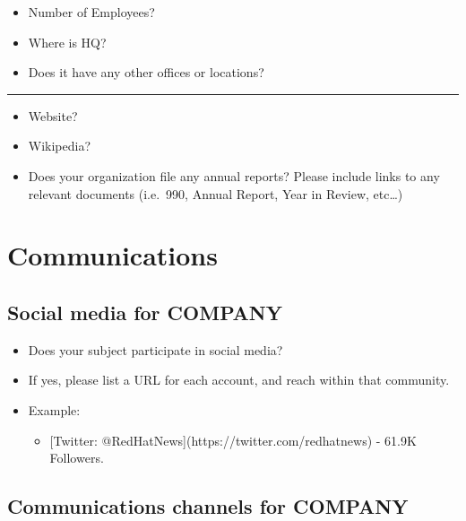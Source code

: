 \begin{itemize}
\itemsep1pt\parskip0pt
\item
  Number of Employees?
\item
  Where is HQ?
\item
  Does it have any other offices or locations?
\end{itemize}

\begin{center}\rule{3in}{0.4pt}\end{center}

\begin{itemize}
\itemsep1pt\parskip0pt
\item
  Website?
\item
  Wikipedia?
\item
  Does your organization file any annual reports? Please include links
  to any relevant documents (i.e.~990, Annual Report, Year in Review,
  etc\ldots{})
\end{itemize}

\section{Communications}\label{communications}

\subsection{Social media for COMPANY}\label{social-media-for-company}

\begin{itemize}
\itemsep1pt\parskip0pt
\item
  Does your subject participate in social media?
\item
  If yes, please list a URL for each account, and reach within that
  community.
\item
  Example:

  \begin{itemize}
  \itemsep1pt\parskip0pt
  \item
    {[}Twitter: @RedHatNews{]}(https://twitter.com/redhatnews) - 61.9K
    Followers.
  \end{itemize}
\end{itemize}

\subsection{Communications channels for
COMPANY}\label{communications-channels-for-company}

